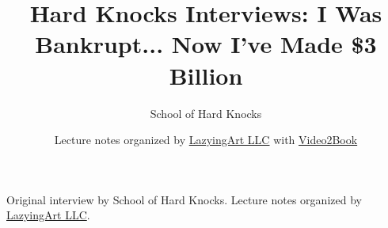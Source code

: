 \documentclass[11pt,oneside]{book}
\begin{document}
\frontmatter
\title{Hard Knocks Interviews: I Was Bankrupt... Now I've Made \$3 Billion}
\author{School of Hard Knocks}
\date{Lecture notes organized by \href{https://lazying.art}{LazyingArt LLC} with \href{https://github.com/lachlanchen/Video2Book}{Video2Book}}
\maketitle
\begin{center}
\small Original interview by School of Hard Knocks. Lecture notes organized by \href{https://lazying.art}{LazyingArt LLC}.
\end{center}
\clearpage
\mainmatter

\end{document}
